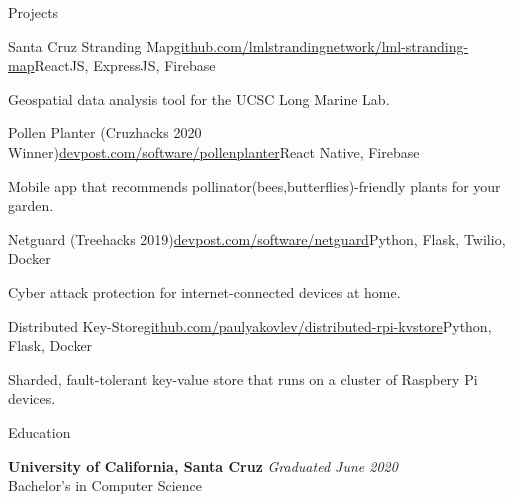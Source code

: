 \documentclass{resume} %
\begin{document}
\begin{rSection}{Projects}
    \begin{rSubsection}{Santa Cruz Stranding Map}{\href{https://github.com/lmlstrandingnetwork/lml-stranding-map}{github.com/lmlstrandingnetwork/lml-stranding-map}}{ReactJS, ExpressJS, Firebase}{}
        \item Geospatial data analysis tool for the UCSC Long Marine Lab.
    \end{rSubsection}

    \begin{rSubsection}{Pollen Planter (Cruzhacks 2020 Winner)}{\href{https://www.devpost.com/software/pollenplanter}{devpost.com/software/pollenplanter}}{React Native, Firebase}{}
        \item Mobile app that recommends pollinator(bees,butterflies)-friendly plants for your garden.
    \end{rSubsection}

    \begin{rSubsection}{Netguard (Treehacks 2019)}{\href{https://www.devpost.com/software/netguard}{devpost.com/software/netguard}}{Python, Flask, Twilio, Docker}{}
        \item Cyber attack protection for internet-connected devices at home.
    \end{rSubsection}

    \begin{rSubsection}{Distributed Key-Store}{\href{https://github.com/paulyakovlev/distributed-rpi-kvstore}{github.com/paulyakovlev/distributed-rpi-kvstore}}{Python, Flask, Docker}{}
        \item Sharded, fault-tolerant key-value store that runs on a cluster of Raspbery Pi devices.
    \end{rSubsection}
\end{rSection}


\begin{rSection}{Education}

    {\bf University of California, Santa Cruz} \hfill {\em Graduated June 2020} \\ 
    Bachelor's in Computer Science

\end{rSection}

\end{document}
